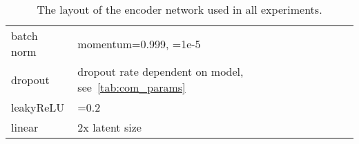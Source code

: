 \documentclass[10pt]{article} \usepackage[accepted]{tmlr}
\begin{document}
\begin{table}[h]
{\begin{tabular}{ll}
\multicolumn{1}{l|}{batch norm}      & momentum=0.999, =1e-5                                                        \\
\multicolumn{1}{l|}{dropout}        & dropout rate dependent on model, see~\ref{tab:com_params}                                                          \\
\multicolumn{1}{l|}{leakyReLU}      & =0.2                                                                            \\
\multicolumn{1}{l|}{linear}         & 2x latent size                                                                       
\end{tabular}}
\caption{\label{tab:enc_archi} The layout of the encoder network used in all experiments.}
\end{table}
\begin{table}[h]
\end{table}
\end{document}
